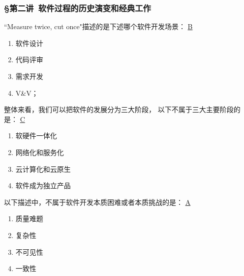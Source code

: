 \subsubsection*{\S 第二讲\ 软件过程的历史演变和经典工作}
\setcounter{problemname}{0}

\begin{problem}
	``Measure twice, cut once"描述的是下述哪个软件开发场景：
	\uline{B}    
    \vspace{-0.8em}
    \begin{multicols}{4}
        \begin{enumerate}[label=\Alph*.]
            \item 软件设计
            \item 代码评审
            \item 需求开发
            \item V\&V；
        \end{enumerate}
    \end{multicols}
    \vspace{-1em}
\end{problem}



\begin{problem}
	整体来看，我们可以把软件的发展分为三大阶段， 以下不属于三大主要阶段的是：
	\uline{C}    
    \vspace{-0.8em}
    \begin{multicols}{4}
        \begin{enumerate}[label=\Alph*.]
            \item 软硬件一体化
            \item 网络化和服务化
            \item 云计算化和云原生
            \item 软件成为独立产品
        \end{enumerate}
    \end{multicols}
    \vspace{-1em}
\end{problem}




\begin{problem}
	以下描述中，不属于软件开发本质困难或者本质挑战的是：
	\uline{A}    
    \vspace{-0.8em}
    \begin{multicols}{4}
        \begin{enumerate}[label=\Alph*.]
            \item 质量难题
            \item 复杂性
            \item 不可见性
            \item 一致性
        \end{enumerate}
    \end{multicols}
    \vspace{-1em}
\end{problem}




